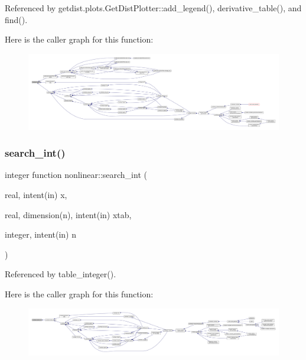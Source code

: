 Referenced by getdist.\+plots.\+Get\+Dist\+Plotter\+::add\+\_\+legend(), derivative\+\_\+table(), and find().

Here is the caller graph for this function\+:
\nopagebreak
\begin{figure}[H]
\begin{center}
\leavevmode
\includegraphics[width=350pt]{namespacenonlinear_ac344cab10a5226c8ef0147ff8f96767a_icgraph}
\end{center}
\end{figure}
\mbox{\label{namespacenonlinear_a210b83a28f6523e35c1b2314bd38ba10}} 
\subsubsection{\texorpdfstring{search\+\_\+int()}{search\_int()}}
{\footnotesize\ttfamily integer function nonlinear\+::search\+\_\+int (\begin{DoxyParamCaption}\item[{real, intent(in)}]{x,  }\item[{real, dimension(n), intent(in)}]{xtab,  }\item[{integer, intent(in)}]{n }\end{DoxyParamCaption})\hspace{0.3cm}{\ttfamily [private]}}



Referenced by table\+\_\+integer().

Here is the caller graph for this function\+:
\nopagebreak
\begin{figure}[H]
\begin{center}
\leavevmode
\includegraphics[width=350pt]{namespacenonlinear_a210b83a28f6523e35c1b2314bd38ba10_icgraph}
\end{center}
\end{figure}
\mbox{\label{namespacenonlinear_a6171546fb42a0d5c085c3ee5c8662e0b}} 
